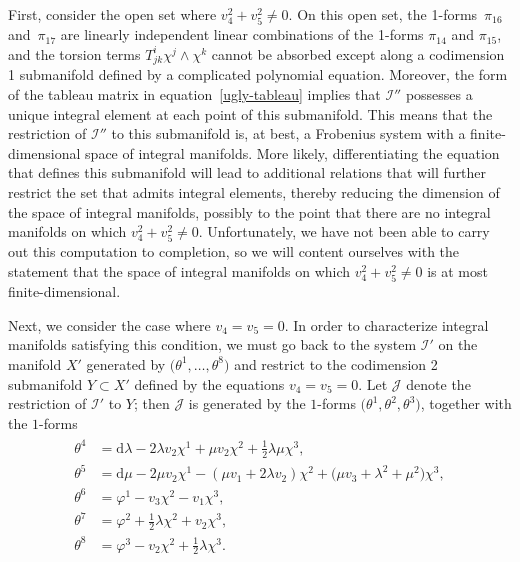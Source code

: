 \documentclass[pdftex]{sigma}
\numberwithin{equation}{section}
\renewcommand{\d}{\mathrm{d}}%
\newcommand{\cI}{{\mathcal I}}
\newcommand{\cJ}{{\mathcal J}}
\begin{document}
First, consider the open set where $v_4^2 + v_5^2 \neq 0$. On this open set, the 1-forms~$\pi_{16}$ and~$\pi_{17}$ are linearly independent linear combinations of the 1-forms $\pi_{14}$ and $\pi_{15}$, and the torsion terms $T^i_{jk} \chi^j \wedge \chi^k$ cannot be absorbed except along a codimension 1 submanifold defined by a complicated polynomial equation. Moreover, the form of the tableau matrix in equation~\eqref{ugly-tableau} implies that $\cI''$ possesses a unique integral element at each point of this submanifold. This means that the restriction of $\cI''$ to this submanifold is, at best, a Frobenius system with a finite-dimensional space of integral manifolds. More likely, differentiating the equation that defines this submanifold will lead to additional relations that will further restrict the set that admits integral elements, thereby reducing the dimension of the space of integral manifolds, possibly to the point that there are no integral manifolds on which $v_4^2 + v_5^2 \neq 0$. Unfortunately, we have not been able to carry out this computation to completion, so we will content ourselves with the statement that the space of integral manifolds on which $v_4^2 + v_5^2 \neq 0$ is at most finite-dimensional.

Next, we consider the case where $v_4 = v_5 = 0$. In order to characterize integral manifolds satisfying this condition, we must go back to the system $\cI'$ on the manifold $X'$ generated by $\big(\theta^1, \ldots, \theta^8\big)$ and restrict to the codimension 2 submanifold $Y \subset X'$ defined by the equations $v_4 = v_5 = 0$. Let $\cJ$ denote the restriction of $\cI'$ to $Y$; then $\cJ$ is generated by the $1$-forms $\big(\theta^1, \theta^2, \theta^3\big)$, together with the $1$-forms
\begin{gather*}%
\begin{aligned}
\theta^4 & = \d\lambda - 2 \lambda v_2 \chi^1 + \mu v_2 \chi^2 + \tfrac{1}{2}\lambda \mu \chi^3, \\
\theta^5 & = \d\mu - 2\mu v_2 \chi^1 - (\mu v_1 + 2\lambda v_2 ) \chi^2 + \big(\mu v_3+ \lambda^2 + \mu^2\big) \chi^3, \\
\theta^6 & = \varphi^1 - v_3 \chi^2 - v_1 \chi^3, \\
\theta^7 & = \varphi^2 + \tfrac{1}{2} \lambda \chi^2 + v_2 \chi^3, \\
\theta^8 & = \varphi^3 - v_2 \chi^2 + \tfrac{1}{2}\lambda \chi^3.
\end{aligned}
\end{gather*}
\end{document}

